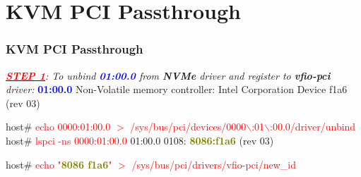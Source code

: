 \documentclass[aspectratio=169]{beamer}
\begin{document}
\section{KVM PCI Passthrough}
\begin{frame}
\frametitle{KVM PCI Passthrough}
\begin{block}{}
\textit{\underline{\textbf{\textcolor{red}{STEP 1}}}: To unbind \textbf{\textcolor{blue}{01:00.0}} from \textbf{NVMe} driver and register to \textbf{vfio-pci} driver:} \newline
{\small \textbf{\textcolor{blue}{01:00.0}} Non-Volatile memory controller: Intel Corporation Device f1a6 (rev 03)}

\vspace{2 mm}

host\# \textcolor{red}{echo 0000:01:00.0 $>$ /sys/bus/pci/devices/0000$\backslash$:01$\backslash$:00.0/driver/unbind} \newline
host\# \textcolor{red}{lspci -ns 0000:01:00.0} \newline
{\small 01:00.0 0108: \textbf{\textcolor{olive}{8086:f1a6}} (rev 03)}

\vspace{1 mm}

host\# \textcolor{red}{echo "\textbf{\textcolor{olive}{8086 f1a6}}" $>$ /sys/bus/pci/drivers/vfio-pci/new\_id}
\end{block}
\end{frame}

\end{document}

